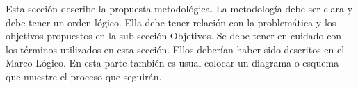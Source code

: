 Esta sección describe la propuesta metodológica. La metodología debe ser clara y debe tener un orden lógico. Ella debe tener relación con la problemática y los objetivos propuestos en la sub-sección Objetivos. Se debe tener en cuidado con los términos utilizados en esta sección. Ellos deberían haber sido descritos en el Marco Lógico. En esta parte también es usual colocar un diagrama o esquema que muestre el proceso que seguirán. 